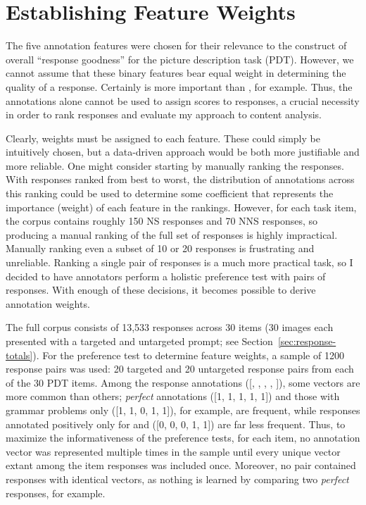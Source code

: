 \section{Establishing Feature Weights}
\label{sec:est-feat-weights}

The five annotation features were chosen for their relevance to the construct of overall ``response goodness'' for the picture description task (PDT). However, we cannot assume that these binary features bear equal weight in determining the quality of a response. Certainly  is more important than , for example. Thus, the annotations alone cannot be used to assign scores to responses, a crucial necessity in order to rank responses and evaluate my approach to content analysis.

Clearly, weights must be assigned to each feature. These could simply be intuitively chosen, but a data-driven approach would be both more justifiable and more reliable. One might consider starting by manually ranking the responses. With responses ranked from best to worst, the distribution of annotations across this ranking could be used to determine some coefficient that represents the importance (weight) of each feature in the rankings. However, for each task item, the corpus contains roughly 150 NS responses and 70 NNS responses, so producing a manual ranking of the full set of responses is highly impractical. Manually ranking even a subset of 10 or 20 responses is frustrating and unreliable. Ranking a single pair of responses is a much more practical task, so I decided to have annotators perform a holistic preference test with pairs of responses. With enough of these decisions, it becomes possible to derive annotation weights.

The full corpus consists of 13,533 responses across 30 items (30 images each presented with a targeted and untargeted prompt; see Section~\ref{sec:response-totals}). For the preference test to determine feature weights, a sample of 1200 response pairs was used: 20 targeted and 20 untargeted response pairs from each of the 30 PDT items. Among the response annotations  ([, , , , ]), some vectors are more common than others; \textit{perfect} annotations ([1, 1, 1, 1, 1]) and those with grammar problems only ([1, 1, 0, 1, 1]), for example, are frequent, while responses annotated positively only for  and  ([0, 0, 0, 1, 1]) are far less frequent. Thus, to maximize the informativeness of the preference tests, for each item, no annotation vector was represented multiple times in the sample until every unique vector extant among the item responses was included once. Moreover, no pair contained responses with identical vectors, as nothing is learned by comparing two \textit{perfect} responses, for example.

